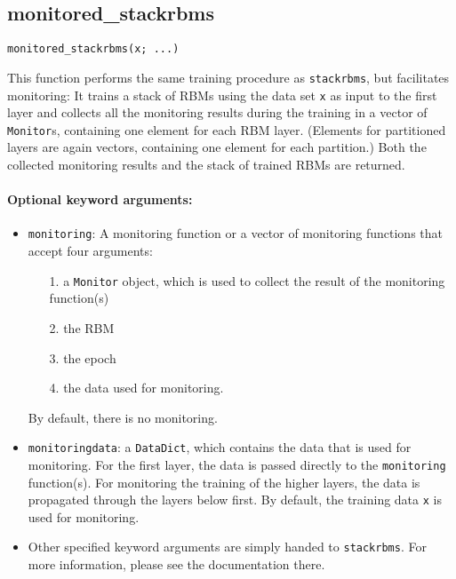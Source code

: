 \subsection*{monitored\_stackrbms}
\begin{verbatim}
monitored_stackrbms(x; ...)
\end{verbatim}
This function performs the same training procedure as \texttt{stackrbms}, but facilitates monitoring: It trains a stack of RBMs using the data set \texttt{x} as input to the first layer and collects all the monitoring results during the training in a vector of \texttt{Monitor}s, containing one element for each RBM layer. (Elements for partitioned layers are again vectors, containing one element for each partition.) Both the collected monitoring results and the stack of trained RBMs are returned.

\paragraph*{Optional keyword arguments:}
\begin{itemize}
\item \texttt{monitoring}: A monitoring function or a vector of monitoring functions that accept four arguments:

\begin{itemize}
\item[1. ] a \texttt{Monitor} object, which is used to collect the result of the monitoring function(s)


\item[2. ] the RBM


\item[3. ] the epoch


\item[4. ] the data used for monitoring.

\end{itemize}
By default, there is no monitoring.


\item \texttt{monitoringdata}: a \texttt{DataDict}, which contains the data that is used for  monitoring. For the first layer, the data is passed directly to the \texttt{monitoring}  function(s). For monitoring the training of the higher layers,  the data is propagated through the layers below first.  By default, the training data \texttt{x} is used for monitoring.


\item Other specified keyword arguments are simply handed to \texttt{stackrbms}. For more information, please see the documentation there.

\end{itemize}
